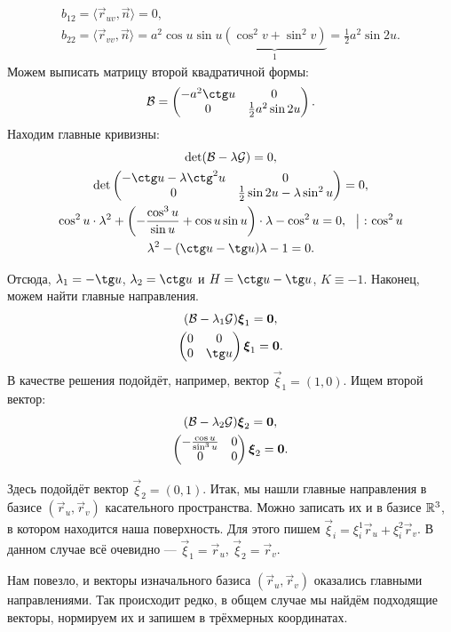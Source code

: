 \begin{solution}
\begin{gather*}
		b_{12} = \langle\vec{r}_{uv}, \vec{n}\rangle = 0,\\
		b_{22} = \langle\vec{r}_{vv}, \vec{n}\rangle = {a^2\cos u\sin u\underbrace{(\cos^2 v + \sin ^2 v)}_{1}} = \frac{1}{2}a^2\sin 2u.
	\end{gather*}
	Можем выписать матрицу второй квадратичной формы:
	\[
		\B =
		\begin{pmatrix}
			-a^2\ctg u & 0\\
			0 & \frac{1}{2}a^2\sin 2u
		\end{pmatrix}.
	\]
	Находим главные кривизны:
	\begin{gather*}
		\det(\B - \lambda\G) = 0,\\
		\det
		\begin{pmatrix}
			-\ctg u - \lambda \ctg^2u & 0\\
			0 & \frac{1}{2}\sin 2u - \lambda \sin^2u
		\end{pmatrix} = 0,\\
		\cos^2u \cdot \lambda^2 + \br{{-\frac{\cos^3u}{\sin u}} + \cos u\sin u} \cdot \lambda -\cos^2 u = 0,\ \ \big|\ {:}\,\cos^2u\\
		\lambda^2 - (\ctg u - \tg u)\lambda - 1 = 0.
	\end{gather*}

	Отсюда, $\lambda_1 = -\tg u$, $\lambda_2 = \ctg u$ и $H = \ctg u - \tg u$, $K \equiv -1$. Наконец, можем найти главные направления.
	\begin{gather*}
		(\B - \lambda_1\G)\vec{\xi}_1 = \vec{0},\\
		\begin{pmatrix}
			0 & 0\\
			0 & \tg u
		\end{pmatrix}\vec{\xi}_1 = \vec{0}.
	\end{gather*}
	В качестве решения подойдёт, например, вектор $\vec{\xi}_1 = (1, 0)$. Ищем второй вектор:
	\begin{gather*}
		(\mathcal{B} - \lambda_2\mathcal{G})\boldsymbol{\xi}_2 = \boldsymbol{0},\\
		\begin{pmatrix}
			-\frac{\cos u}{\sin^3 u} & 0\\
			0 & 0
		\end{pmatrix}\boldsymbol{\xi}_2 = \boldsymbol{0}.
	\end{gather*}

	Здесь подойдёт вектор $\vec{\xi}_2 = (0, 1)$. Итак, мы нашли главные направления в базисе $(\vec{r}_u, \vec{r}_v)$ касательного пространства. Можно записать их и в базисе $\mathbb{R}^3$, в котором находится наша поверхность. Для этого пишем $\vec{\xi}_i = \xi_i^1\vec{r}_u + \xi_i^2\vec{r}_v$. В данном случае всё очевидно --- $\vec{\xi}_1 = \vec{r}_u$, $\vec{\xi}_2 = \vec{r}_v$.

	Нам повезло, и векторы изначального базиса $(\vec{r}_u, \vec{r}_v)$ оказались главными направлениями. Так происходит редко, в общем случае мы найдём подходящие векторы, нормируем их и запишем в трёхмерных координатах.
\end{solution}


